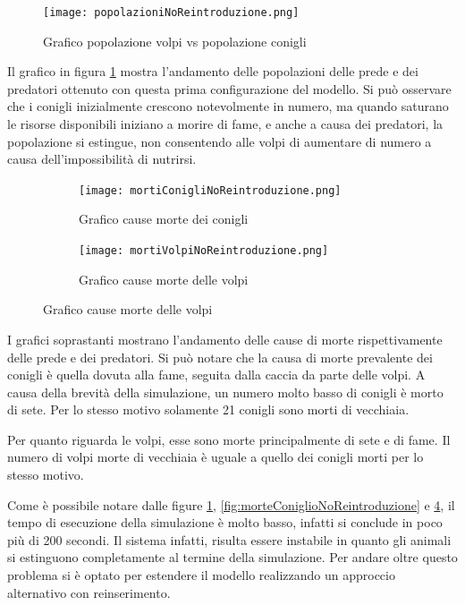 \documentclass[11pt]{article}
\begin{document}
\begin{figure}[h!]
     \centering
     \texttt{[image: popolazioniNoReintroduzione.png]}
     \caption{Grafico popolazione volpi vs popolazione conigli}
     \label{fig:coniglioVolpeNoReintroduzione}
\end{figure}

Il grafico in figura \ref{fig:coniglioVolpeNoReintroduzione} mostra l'andamento delle popolazioni delle prede e dei predatori ottenuto con questa prima configurazione del modello. Si può osservare che i conigli inizialmente crescono notevolmente in numero, ma quando saturano le risorse disponibili iniziano a morire di fame, e anche a causa dei predatori, la popolazione si estingue, non consentendo alle volpi di aumentare di numero a causa dell'impossibilità di nutrirsi. 


\begin{figure}[h!]
	\hspace{-12mm}
	\begin{subfigure}{.5\textwidth}
            \centering
            \texttt{[image: mortiConigliNoReintroduzione.png]}
            \caption{Grafico cause morte dei conigli}
            \label{fig:morteConigliNoReintroduzione}
	\end{subfigure}
		\hspace{5mm}
		\begin{subfigure}{.5\textwidth}
		\centering
        \texttt{[image: mortiVolpiNoReintroduzione.png]}
        \caption{Grafico cause morte delle volpi}
        \label{fig:morteVolpeNoReintroduzione}
	\end{subfigure}
\end{figure}

I grafici soprastanti mostrano l'andamento delle cause di morte rispettivamente delle prede e dei predatori. Si può notare che la causa di morte prevalente dei conigli è quella dovuta alla fame, seguita dalla caccia da parte delle volpi. A causa della brevità della simulazione, un numero molto basso di conigli è morto di sete. Per lo stesso motivo solamente 21 conigli sono morti di vecchiaia. 

Per quanto riguarda le volpi, esse sono morte principalmente di sete e di fame. Il numero di volpi morte di vecchiaia è uguale a quello dei conigli morti per lo stesso motivo. 

\vspace{0.5cm}

\noindent Come è possibile notare dalle figure \ref{fig:coniglioVolpeNoReintroduzione}, \ref{fig:morteConiglioNoReintroduzione} e \ref{fig:morteVolpeNoReintroduzione}, il tempo di esecuzione della simulazione è molto basso, infatti si conclude in poco più di 200 secondi. Il sistema infatti, risulta essere instabile in quanto gli animali si estinguono completamente al termine della simulazione. 
Per andare oltre questo problema si è optato per estendere il modello realizzando un approccio alternativo con reinserimento.
\end{document}
